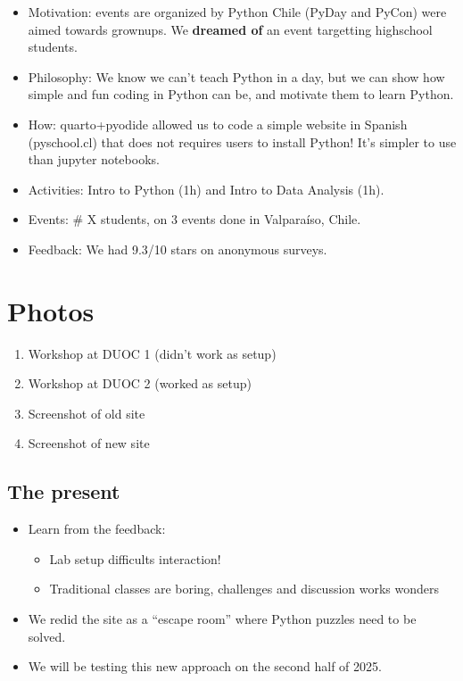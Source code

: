 \documentclass[
  letterpaper,
  DIV=11,
  numbers=noendperiod]{scrartcl}
\providecommand{\tightlist}{%
  \setlength{\itemsep}{0pt}\setlength{\parskip}{0pt}}\usepackage{longtable,booktabs,array}
\begin{document}
\begin{itemize}
\tightlist
\item
  Motivation: events are organized by Python Chile (PyDay and PyCon)
  were aimed towards grownups. We \textbf{dreamed of} an event
  targetting highschool students.
\item
  Philosophy: We know we can't teach Python in a day, but we can show
  how simple and fun coding in Python can be, and motivate them to learn
  Python.
\item
  How: quarto+pyodide allowed us to code a simple website in Spanish
  (pyschool.cl) that does not requires users to install Python! It's
  simpler to use than jupyter notebooks.
\item
  Activities: Intro to Python (1h) and Intro to Data Analysis (1h).
\item
  Events: \# X students, on 3 events done in Valparaíso, Chile.
\item
  Feedback: We had 9.3/10 stars on anonymous surveys.
\end{itemize}

\section{Photos}\label{photos}

\begin{enumerate}
\def\labelenumi{\arabic{enumi}.}
\tightlist
\item
  Workshop at DUOC 1 (didn't work as setup)
\item
  Workshop at DUOC 2 (worked as setup)
\item
  Screenshot of old site
\item
  Screenshot of new site
\end{enumerate}

\subsection{The present}\label{the-present}

\begin{itemize}
\tightlist
\item
  Learn from the feedback:

  \begin{itemize}
  \tightlist
  \item
    Lab setup difficults interaction!
  \item
    Traditional classes are boring, challenges and discussion works
    wonders
  \end{itemize}
\item
  We redid the site as a ``escape room'' where Python puzzles need to be
  solved.
\item
  We will be testing this new approach on the second half of 2025.
\end{itemize}
\end{document}
